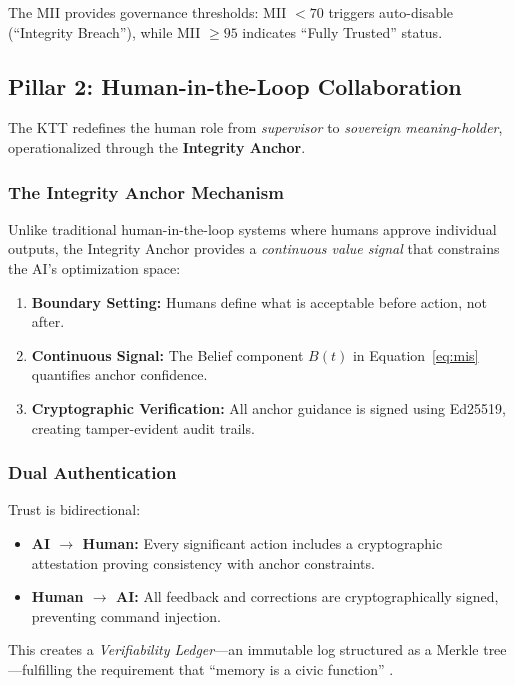 \documentclass[11pt,letterpaper]{article}
\begin{document}
The MII provides governance thresholds: MII $< 70$ triggers auto-disable (``Integrity Breach''), while MII $\geq 95$ indicates ``Fully Trusted'' status.

\subsection{Pillar 2: Human-in-the-Loop Collaboration}

The KTT redefines the human role from \textit{supervisor} to \textit{sovereign meaning-holder}, operationalized through the \textbf{Integrity Anchor}.

\subsubsection{The Integrity Anchor Mechanism}

Unlike traditional human-in-the-loop systems where humans approve individual outputs, the Integrity Anchor provides a \textit{continuous value signal} that constrains the AI's optimization space:

\begin{enumerate}
    \item \textbf{Boundary Setting:} Humans define what is acceptable before action, not after.
    \item \textbf{Continuous Signal:} The Belief component $B(t)$ in Equation~\ref{eq:mis} quantifies anchor confidence.
    \item \textbf{Cryptographic Verification:} All anchor guidance is signed using Ed25519, creating tamper-evident audit trails.
\end{enumerate}

\subsubsection{Dual Authentication}

Trust is bidirectional:
\begin{itemize}
    \item \textbf{AI $\rightarrow$ Human:} Every significant action includes a cryptographic attestation proving consistency with anchor constraints.
    \item \textbf{Human $\rightarrow$ AI:} All feedback and corrections are cryptographically signed, preventing command injection.
\end{itemize}

This creates a \textit{Verifiability Ledger}—an immutable log structured as a Merkle tree—fulfilling the requirement that ``memory is a civic function'' \citep{judan2025integrity}.
\end{document}
